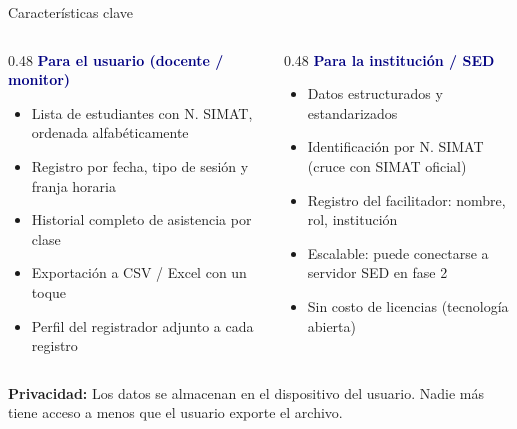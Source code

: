 \documentclass[aspectratio=169, 12pt]{beamer}
\begin{document}
\begin{frame}{Características clave}
\vspace{0.15cm}
\begin{columns}[T]
  \begin{column}{0.48\textwidth}
    \textcolor{navy}{\bfseries Para el usuario (docente / monitor)}
    \begin{itemize}\setlength\itemsep{5pt}
      \item Lista de estudiantes con N.\textdegree{} SIMAT, ordenada alfabéticamente
      \item Registro por fecha, tipo de sesión y franja horaria
      \item Historial completo de asistencia por clase
      \item Exportación a CSV / Excel con un toque
      \item Perfil del registrador adjunto a cada registro
    \end{itemize}
  \end{column}
  \begin{column}{0.48\textwidth}
    \textcolor{navy}{\bfseries Para la institución / SED}
    \begin{itemize}\setlength\itemsep{5pt}
      \item Datos estructurados y estandarizados
      \item Identificación por N.\textdegree{} SIMAT (cruce con SIMAT oficial)
      \item Registro del facilitador: nombre, rol, institución
      \item Escalable: puede conectarse a servidor SED en fase 2
      \item Sin costo de licencias (tecnología abierta)
    \end{itemize}
  \end{column}
\end{columns}
\vspace{0.25cm}
\begin{tcolorbox}[colback=verde!6, colframe=verde, arc=8pt, boxrule=1pt,
  left=6pt, right=6pt, top=4pt, bottom=4pt]
  \textcolor{verde}{\bfseries Privacidad:} Los datos se almacenan en el dispositivo del usuario. Nadie más tiene acceso a menos que el usuario exporte el archivo.
\end{tcolorbox}
\end{frame}
\end{document}

